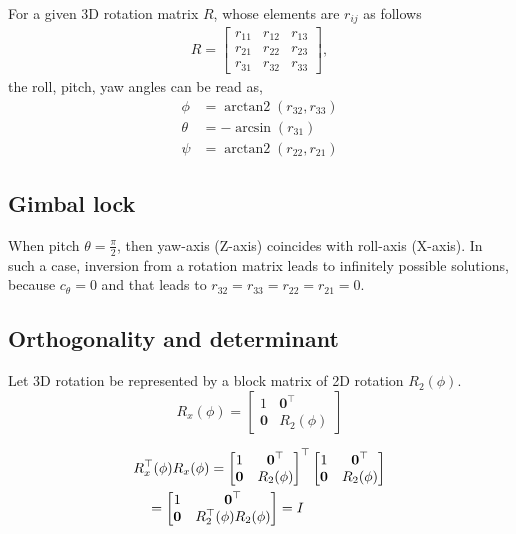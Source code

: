 \documentclass{article}
\DeclareMathOperator{\atantwo}{arctan2}
\begin{document}
For a  given 3D  rotation matrix $R$, whose   elements  are   $r_{ij}$ as follows
%
\begin{align}
R =  \begin{bmatrix}
  r_{11}  &   r_{12} &   r_{13}   \\
  r_{21}  &   r_{22} &   r_{23}   \\
  r_{31}  &   r_{32} &   r_{33} 
  \end{bmatrix},
\end{align}
%
the roll,  pitch, yaw  angles can  be read as,
\begin{align}
  \phi &= \atantwo(r_{32},   r_{33}) \\
  \theta &= -\arcsin(r_{31}) \\
  \psi &= \atantwo(r_{22}, r_{21})
  \end{align}

\subsection{Gimbal lock}

When pitch $\theta  = \frac{\pi}{2}$, then yaw-axis (Z-axis) coincides with
roll-axis (X-axis). In such a  case,  inversion from a rotation matrix leads to
infinitely possible solutions, because  $c_\theta = 0$ and   that leads  to
$r_{32} = r_{33} =  r_{22} = r_{21} = 0$.

\subsection{Orthogonality and determinant}
Let 3D rotation  be represented  by a block matrix of 2D rotation $R_2(\phi)$.
\[
  R_x(\phi) = \begin{bmatrix}
          1  &   \boldsymbol{0}^\top   \\
               \boldsymbol{0}  &   R_2(\phi)
          \end{bmatrix}
\]

\begin{align}
  &R_x^\top(\phi) R_x(\phi) =  \begin{bmatrix}
    1  &   \boldsymbol{0}^\top   \\
    \boldsymbol{0}  &   R_2(\phi)
  \end{bmatrix}^\top
  \begin{bmatrix}
    1  &   \boldsymbol{0}^\top   \\
    \boldsymbol{0}  &   R_2(\phi)
  \end{bmatrix}
 \notag\\
  &\quad
 =
  \begin{bmatrix}
    1  &   \boldsymbol{0}^\top   \\
    \boldsymbol{0}  &   R_2^\top(\phi)R_2(\phi)
  \end{bmatrix}
                      = I
\end{align}
\end{document}
